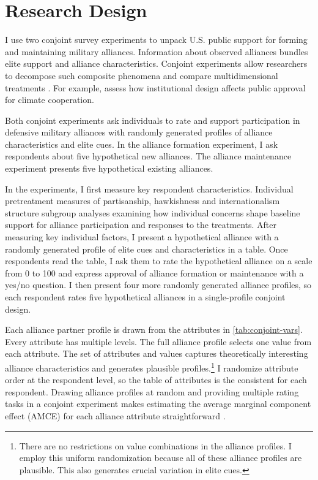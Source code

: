 \documentclass[12pt]{article}
\begin{document}
\section{Research Design}


I use two conjoint survey experiments to unpack U.S. public support for forming and maintaining military alliances. 
Information about observed alliances bundles elite support and alliance characteristics. 
Conjoint experiments allow researchers to decompose such composite phenomena and compare multidimensional treatments \citep{Hainmuelleretal2014}. 
For example, \citet{BechtelScheve2013} assess how institutional design affects public approval for climate cooperation. 


Both conjoint experiments ask individuals to rate and support participation in defensive military alliances with randomly generated profiles of alliance characteristics and elite cues. 
In the alliance formation experiment, I ask respondents about five hypothetical new alliances. 
The alliance maintenance experiment presents five hypothetical existing alliances.


In the experiments, I first measure key respondent characteristics.  
Individual pretreatment measures of partisanship, hawkishness and internationalism structure subgroup analyses examining how individual concerns shape baseline support for alliance participation and responses to the treatments. 
After measuring key individual factors, I present a hypothetical alliance with a randomly generated profile of elite cues and characteristics in a table.
Once respondents read the table, I ask them to rate the hypothetical alliance on a scale from 0 to 100 and express approval of alliance formation or maintenance with a yes/no question. 
I then present four more randomly generated alliance profiles, so each respondent rates five hypothetical alliances in a single-profile conjoint design.%


Each alliance partner profile is drawn from the attributes in \autoref{tab:conjoint-vars}.
Every attribute has multiple levels.
The full alliance profile selects one value from each attribute. 
The set of attributes and values captures theoretically interesting alliance characteristics and generates plausible profiles.\footnote{There are no restrictions on value combinations in the alliance profiles. I employ this uniform randomization because all of these alliance profiles are plausible. This also generates crucial variation in elite cues.}
I randomize attribute order at the respondent level, so the table of attributes is the consistent for each respondent. 
Drawing alliance profiles at random and providing multiple rating tasks in a conjoint experiment makes estimating the average marginal component effect (AMCE) for each alliance attribute straightforward \citep{Hainmuelleretal2014}. 
\end{document}
